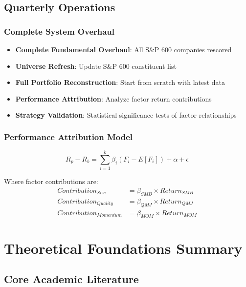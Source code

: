 \documentclass[12pt,a4paper]{article}
\begin{document}
\subsection{Quarterly Operations}

\subsubsection{Complete System Overhaul}
\begin{itemize}
    \item \textbf{Complete Fundamental Overhaul}: All S\&P 600 companies rescored
    \item \textbf{Universe Refresh}: Update S\&P 600 constituent list
    \item \textbf{Full Portfolio Reconstruction}: Start from scratch with latest data
    \item \textbf{Performance Attribution}: Analyze factor return contributions
    \item \textbf{Strategy Validation}: Statistical significance tests of factor relationships
\end{itemize}

\subsubsection{Performance Attribution Model}
\begin{equation}
R_p - R_b = \sum_{i=1}^k \beta_i (F_i - E[F_i]) + \alpha + \epsilon
\end{equation}

Where factor contributions are:
\begin{align}
Contribution_{Size} &= \beta_{SMB} \times Return_{SMB} \\
Contribution_{Quality} &= \beta_{QMJ} \times Return_{QMJ} \\
Contribution_{Momentum} &= \beta_{MOM} \times Return_{MOM}
\end{align}

\section{Theoretical Foundations Summary}

\subsection{Core Academic Literature}
\end{document}
